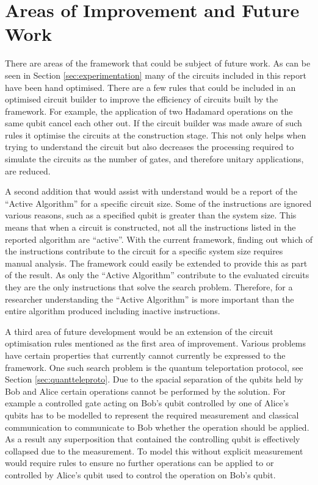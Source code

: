 \section{Areas of Improvement and Future Work}

There are areas of the framework that could be subject of future work.
As can be seen in Section \ref{sec:experimentation} many of the circuits included in this report have been hand optimised.
There are a few rules that could be included in an optimised circuit builder to improve the efficiency of circuits built by the framework.
For example, the application of two Hadamard operations on the same qubit cancel each other out.
If the circuit builder was made aware of such rules it optimise the circuits at the construction stage.
This not only helps when trying to understand the circuit but also decreases the processing required to simulate the circuits as the number of gates, and therefore unitary applications, are reduced.

A second addition that would assist with understand would be a report of the ``Active Algorithm'' for a specific circuit size.
Some of the instructions are ignored various reasons, such as a specified qubit is greater than the system size.
This means that when a circuit is constructed, not all the instructions listed in the reported algorithm are ``active''.
With the current framework, finding out which of the instructions contribute to the circuit for a specific system size requires manual analysis.
The framework could easily be extended to provide this as part of the result.
As only the ``Active Algorithm'' contribute to the evaluated circuits they are the only instructions that solve the search problem.
Therefore, for a researcher understanding the ``Active Algorithm'' is more important than the entire algorithm produced including inactive instructions.

A third area of future development would be an extension of the circuit optimisation rules mentioned as the first area of improvement.
Various problems have certain properties that currently cannot currently be expressed to the framework.
One such search problem is the quantum teleportation protocol, see Section \ref{sec:quantteleproto}.
Due to the spacial separation of the qubits held by Bob and Alice certain operations cannot be performed by the solution.
For example a controlled gate acting on Bob's qubit controlled by one of Alice's qubits has to be modelled to represent the required measurement and classical communication to communicate to Bob whether the operation should be applied.
As a result any superposition that contained the controlling qubit is effectively collapsed due to the measurement.
To model this without explicit measurement would require rules to ensure no further operations can be applied to or controlled by Alice's qubit used to control the operation on Bob's qubit.

